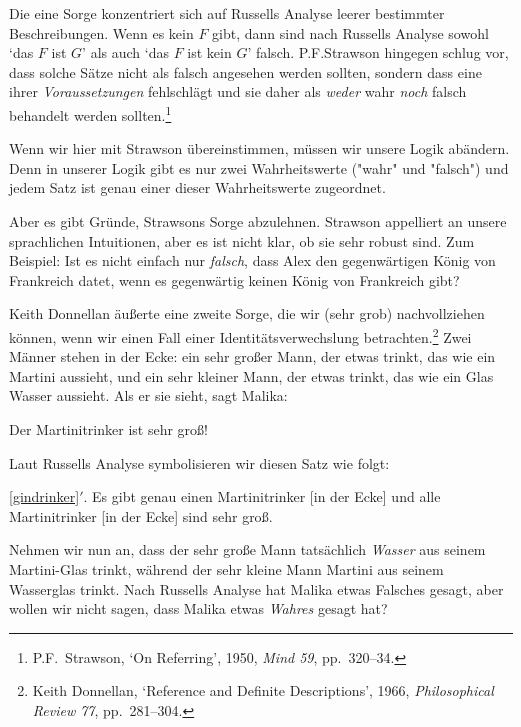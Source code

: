 Die eine Sorge konzentriert sich auf Russells Analyse leerer bestimmter Beschreibungen. Wenn es kein $F$ gibt, dann sind nach Russells Analyse sowohl `das $F$ ist $G$' als auch `das $F$ ist kein $G$' falsch. P.F.\@ Strawson hingegen schlug vor, dass solche Sätze nicht als falsch angesehen werden sollten, sondern dass eine ihrer \emph{Voraussetzungen} fehlschlägt und sie daher als \emph{weder} wahr \emph{noch} falsch behandelt werden sollten.\footnote{P.F.\ Strawson, `On Referring', 1950, \emph{Mind 59}, pp.\ 320--34.} 

Wenn wir hier mit Strawson übereinstimmen, müssen wir unsere Logik abändern. Denn in unserer Logik gibt es nur zwei Wahrheitswerte ("wahr" und "falsch") und jedem Satz ist genau einer dieser Wahrheitswerte zugeordnet. 

Aber es gibt Gründe, Strawsons Sorge abzulehnen. Strawson appelliert an unsere sprachlichen Intuitionen, aber es ist nicht klar, ob sie sehr robust sind. Zum Beispiel: Ist es nicht einfach nur \emph{falsch}, dass Alex den gegenwärtigen König von Frankreich datet, wenn es gegenwärtig keinen König von Frankreich gibt?

Keith Donnellan äu{\ss}erte eine zweite Sorge, die wir (sehr grob) nachvollziehen können, wenn wir einen Fall einer Identitätsverwechslung betrachten.\footnote{Keith Donnellan, `Reference and Definite Descriptions', 1966, \emph{Philosophical Review 77}, pp.\ 281--304.} Zwei Männer stehen in der Ecke: ein sehr gro{\ss}er Mann, der etwas trinkt, das wie ein Martini aussieht, und ein sehr kleiner Mann, der etwas trinkt, das wie ein Glas Wasser aussieht. Als er sie sieht, sagt Malika:
	\begin{earg}
		\item[\ex{gindrinker}] Der Martinitrinker ist sehr gro{\ss}!
	\end{earg}
Laut Russells Analyse symbolisieren wir diesen Satz wie folgt:
	\begin{earg}
		\item[\ref{gindrinker}$'$.] Es gibt genau einen Martinitrinker [in der Ecke] und alle Martinitrinker [in der Ecke] sind sehr gro{\ss}.
	\end{earg}
Nehmen wir nun an, dass der sehr gro{\ss}e Mann tatsächlich \emph{Wasser} aus seinem Martini-Glas trinkt, während der sehr kleine Mann Martini aus seinem Wasserglas trinkt. Nach Russells Analyse hat Malika etwas Falsches gesagt, aber wollen wir nicht sagen, dass Malika etwas \emph{Wahres} gesagt hat? 

